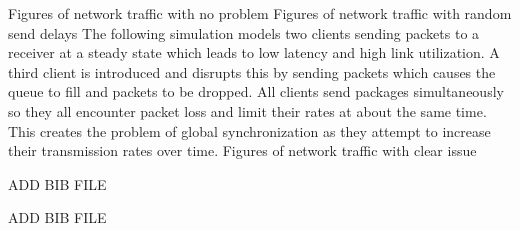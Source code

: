 \documentclass{article}
\begin{document}
																			{ Figures of network traffic with no problem }
																			{ Figures of network traffic with random send delays }
	The following simulation models two clients sending packets to a receiver at a steady state which leads to low latency and high link utilization. A third client is introduced and disrupts this by sending packets which causes the queue to fill and packets to be dropped. All clients send packages simultaneously so they all encounter packet loss and limit their rates at about the same time. This creates the problem of global synchronization as they attempt to increase their transmission rates over time.\newline
																			{ Figures of network traffic with clear issue }
\begin{thebibliography}{9}
ADD BIB FILE

ADD BIB FILE
\end{thebibliography}
\end{document}
